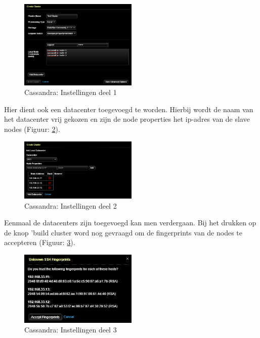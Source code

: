 \begin{figure}[H]
  	\centering
    \includegraphics[width=0.5\textwidth]{img/4_1_installatie_cassandra/1_Configuration_part_1}
    \caption{Cassandra: Instellingen deel 1}
    \label{fig:cas_conf_1}
\end{figure}

Hier dient ook een datacenter toegevoegd te worden.
Hierbij wordt de naam van het datacenter vrij gekozen en zijn de node properties het ip-adres van de slave nodes (Figuur: \ref{fig:cas_conf_2}).

\begin{figure}[H]
  	\centering
    \includegraphics[width=0.5\textwidth]{img/4_1_installatie_cassandra/1_Configuration_part_2}
    \caption{Cassandra: Instellingen deel 2}
    \label{fig:cas_conf_2}
\end{figure}

Eenmaal de datacenters zijn toegevoegd kan men verdergaan.
Bij het drukken op de knop 'build cluster word nog gevraagd om de fingerprints van de nodes te accepteren (Figuur: \ref{fig:cas_conf_3}).

\begin{figure}[H]
  	\centering
    \includegraphics[width=0.5\textwidth]{img/4_1_installatie_cassandra/1_Configuration_part_3}
    \caption{Cassandra: Instellingen deel 3}
    \label{fig:cas_conf_3}
\end{figure}

